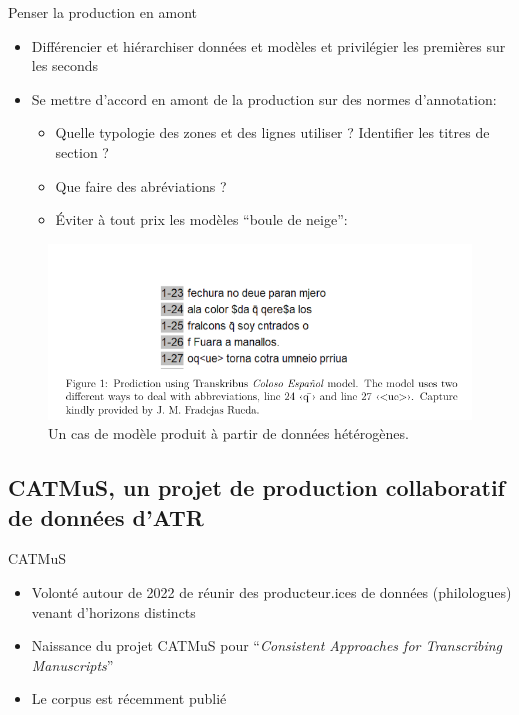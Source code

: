 \documentclass[11pt,aspectratio=169]{beamer}
\let\cite\parencite
\begin{document}
\begin{frame}{Penser la production en amont}
\begin{itemize}
\item Différencier et hiérarchiser données et modèles et privilégier les premières sur les seconds
\pause\item Se mettre d'accord en amont de la production sur des normes d'annotation:

	\begin{itemize}
	\pause\item Quelle typologie des zones et des lignes utiliser ? Identifier les titres de section ?
	\pause\item Que faire des abréviations ?
	\pause\item Éviter à tout prix les modèles \enquote{boule de neige}:
	\end{itemize}
\end{itemize}
\begin{figure}
    \centering
    \includegraphics[width=.5\textwidth]{img/snowball.png}
    \caption{Un cas de modèle produit à partir de données hétérogènes. \cite{pinche_CATMuSMedievalConsistentApproaches_2024}}
    \label{fig:coloseo}
\end{figure}
\end{frame}


\subsection{CATMuS, un projet de production collaboratif de données d'ATR}

\begin{frame}{CATMuS}
\begin{itemize}
\item Volonté autour de 2022 de réunir des producteur.ices de données (philologues) venant d'horizons distincts
\item Naissance du projet CATMuS pour \enquote{\textit{Consistent Approaches for Transcribing Manuscripts}}
\item Le corpus est récemment publié \cite{clerice_CATMuSMedievalMultilingual_2024a}
\end{itemize}
\end{frame}
\end{document}
